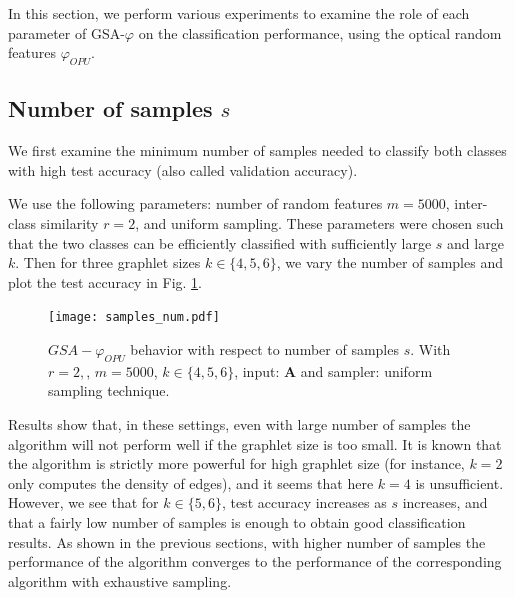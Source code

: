 In this section, we perform various experiments to examine the role of each parameter of GSA-$\varphi$ on the classification performance, using the optical random features $\varphi_{OPU}$.

\subsection{Number of samples $s$}
We first examine the minimum number of samples needed to classify both classes with high test accuracy (also called validation accuracy).

We use the following parameters: number of random features $m=5000$, inter-class similarity $r=2$, and uniform sampling. These parameters were chosen such that the two classes can be efficiently classified with sufficiently large $s$ and large $k$. Then for three graphlet sizes $k\in\{4,5,6\}$, we vary the number of samples and plot the test accuracy in Fig. \ref{fig:varying_samples_num}.

\begin{figure}[H]
\centering
\texttt{[image: samples\_num.pdf]}
\caption[$GSA-\varphi_{OPU}$ behavior with respect to number of samples $s$]{$GSA-\varphi_{OPU}$ behavior with respect to number of samples $s$. With $r=2,$, $m=5000$, $k\in\{4,5,6\}$, input: $\mathbf{A}$ and sampler: uniform sampling technique.}
\label{fig:varying_samples_num}
\end{figure}
Results show that, in these settings, even with large number of samples the algorithm will not perform well if the graphlet size is too small. It is known that the algorithm is strictly more powerful for high graphlet size (for instance, $k=2$ only computes the density of edges), and it seems that here $k=4$ is unsufficient. %
However, we see that for $k\in\{5,6\}$, test accuracy increases as $s$ increases, and that a fairly low number of samples is enough to obtain good classification results. As shown in the previous sections, with higher number of samples the performance of the algorithm converges to the performance of the corresponding algorithm with exhaustive sampling.

